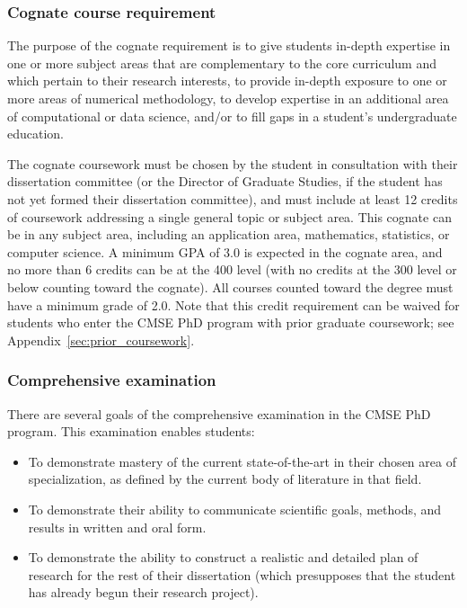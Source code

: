 \vspace{3mm}
\subsubsection{Cognate course requirement}
\label{sec:cognate_course}

The purpose of the cognate requirement is to give students in-depth
expertise in one or more subject areas that are complementary to the
core curriculum and which pertain to their research interests, to
provide in-depth exposure to one or more areas of numerical
methodology, to develop expertise in an additional area of
computational or data science, and/or to fill gaps in a student's
undergraduate education.

The cognate coursework must be chosen by the student in consultation
with their dissertation committee (or the Director of Graduate
Studies, if the student has not yet formed their dissertation
committee), and must include at least 12 credits of 
coursework addressing a single general topic or subject area.  This
cognate can be in any subject area, including an application area,
mathematics, statistics, or computer science.  A minimum GPA of 3.0 is
expected in the cognate area, and no more than 6 credits can be at
the 400 level (with no credits at the 300 level or below counting
toward the cognate).  All courses counted toward the degree must
have a minimum grade of 2.0.  Note that this
credit requirement can be waived for students who enter the CMSE PhD
program with prior graduate coursework; see
Appendix~\ref{sec:prior_coursework}.

\vspace{3mm}
\subsubsection{Comprehensive examination}
\label{sec:comp_exam}

There are several goals of the comprehensive examination in the CMSE
PhD program.  This examination enables students:

\begin{itemize}
\item To demonstrate mastery of the current state-of-the-art in their
  chosen area of specialization, as defined by the current body of
  literature in that field.

\item To demonstrate their ability to communicate scientific goals,
  methods, and results in written and oral form. 

\item To demonstrate the ability to construct a realistic and detailed
  plan of research for the rest of their dissertation (which
  presupposes that the student has already begun their research project).

\end{itemize}

